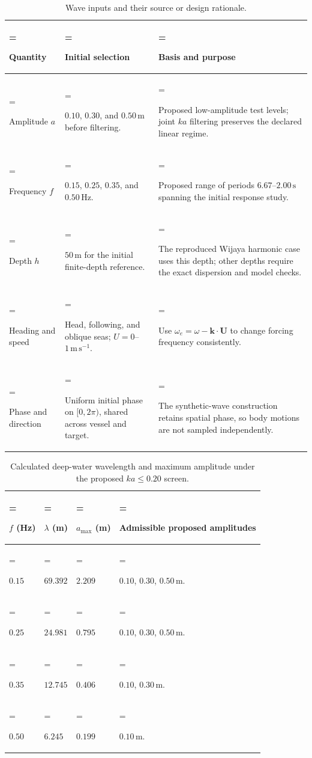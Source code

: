 \documentclass[10pt,letterpaper]{article}
\begin{document}
\begin{table}[H]
\centering
\caption{Wave inputs and their source or design rationale.}
\label{tab:wave-choices}
\small
\begin{tabularx}{\textwidth}{@{}>{\hsize=0.7\hsize\linewidth=\hsize\raggedright\arraybackslash}X>{\hsize=1.0\hsize\linewidth=\hsize\raggedright\arraybackslash}X>{\hsize=1.3\hsize\linewidth=\hsize\raggedright\arraybackslash}X@{}}
\toprule
Quantity & Initial selection & Basis and purpose \\
\midrule
Amplitude $a$ & $0.10$, $0.30$, and $0.50\,\mathrm{m}$ before filtering. & Proposed low-amplitude test levels; joint $ka$ filtering preserves the declared linear regime. \\
Frequency $f$ & $0.15$, $0.25$, $0.35$, and $0.50\,\mathrm{Hz}$. & Proposed range of periods $6.67$--$2.00\,\mathrm{s}$ spanning the initial response study. \\
Depth $h$ & $50\,\mathrm{m}$ for the initial finite-depth reference. & The reproduced Wijaya harmonic case uses this depth; other depths require the exact dispersion and model checks. \cite{Wijaya2017Reconstruction} \\
Heading and speed & Head, following, and oblique seas; $U=0$--$1\,\mathrm{m\,s^{-1}}$. & Use $\omega_e=\omega-\mathbf{k}\cdot\mathbf{U}$ to change forcing frequency consistently. \cite{MITOCW2002WaveBody} \\
Phase and direction & Uniform initial phase on $[0,2\pi)$, shared across vessel and target. & The synthetic-wave construction retains spatial phase, so body motions are not sampled independently. \cite{Wijaya2017Reconstruction} \\
\bottomrule
\end{tabularx}
\end{table}
\begin{table}[H]
\centering
\caption{Calculated deep-water wavelength and maximum amplitude under the proposed $ka\leq0.20$ screen.}
\label{tab:wave-constraints}
\small
\begin{tabularx}{\textwidth}{@{}>{\hsize=0.6\hsize\linewidth=\hsize\raggedright\arraybackslash}X>{\hsize=0.8\hsize\linewidth=\hsize\raggedright\arraybackslash}X>{\hsize=0.8\hsize\linewidth=\hsize\raggedright\arraybackslash}X>{\hsize=1.8\hsize\linewidth=\hsize\raggedright\arraybackslash}X@{}}
\toprule
$f$ (Hz) & $\lambda$ (m) & $a_{\max}$ (m) & Admissible proposed amplitudes \\
\midrule
$0.15$ & $69.392$ & $2.209$ & $0.10$, $0.30$, $0.50\,\mathrm{m}$. \\
$0.25$ & $24.981$ & $0.795$ & $0.10$, $0.30$, $0.50\,\mathrm{m}$. \\
$0.35$ & $12.745$ & $0.406$ & $0.10$, $0.30\,\mathrm{m}$. \\
$0.50$ & $6.245$ & $0.199$ & $0.10\,\mathrm{m}$. \\
\bottomrule
\end{tabularx}
\end{table}
\end{document}
